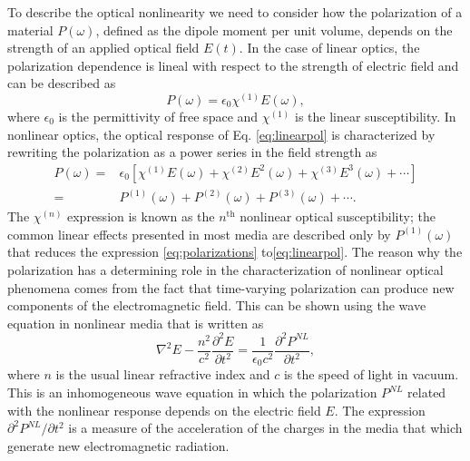 To describe the optical nonlinearity we need to consider how the polarization
of a material $P(\omega)$, defined as the dipole moment per unit volume,
depends on the strength of an applied optical field $E (t)$. In the case of
linear optics, the polarization dependence is lineal with respect to the
strength of electric field and can be described as
\begin{equation}
P (\omega) = \epsilon_{0} \chi^{(1)} E (\omega),
\label{eq:linearpol}
\end{equation}
where $\epsilon_{0}$ is the permittivity of free space and $\chi^{(1)}$ is the
linear susceptibility. In nonlinear optics, the optical response of Eq.
\eqref{eq:linearpol} is characterized by rewriting the polarization as a power
series in the field strength as 
\begin{equation}
\begin{aligned}
P (\omega)
=& 
\epsilon_{0} [ 
\chi^{(1)} E (\omega) + 
\chi^{(2)} E^{2} (\omega) + 
\chi^{(3)} E^{3} (\omega) + 
\cdots ]
\\
=&
P^{(1)} (\omega) + P^{(2)} (\omega) + P^{(3)} (\omega) + \cdots
.
\label{eq:polarizations}
\end{aligned}
\end{equation}
The $\chi^{(n)}$ expression is known as the $n^{\text{th}}$ nonlinear optical
susceptibility; the common linear effects presented in most media are described
only by $P^{(1)} (\omega)$ that reduces the expression \eqref{eq:polarizations}
to\eqref{eq:linearpol}. 
% 
The reason why the polarization has a determining role in the characterization
of nonlinear optical phenomena comes from the fact that time-varying
polarization can produce new components of the electromagnetic field. This can
be shown using the wave equation in nonlinear media that is written as
\cite{boyd03book}
\begin{equation}
\nabla^{2} E - \frac{n^2}{c^2} \frac{\partial^{2} E}{\partial t^{2}} = 
\frac{1}{\epsilon_{0} c^{2}}\frac{\partial^{2} P^{NL}}{\partial t^{2}}
,
\label{eq:waveeq}
\end{equation}
where $n$ is the usual linear refractive index and $c$ is the speed of light in
vacuum. This is an inhomogeneous wave equation in which the polarization $P^
{NL}$ related with the nonlinear response depends on the electric field $E$.
The expression $\partial^{2}P^{NL}/\partial t^{2}$ is a measure of the
acceleration of the charges in the media that which generate new
electromagnetic radiation.

